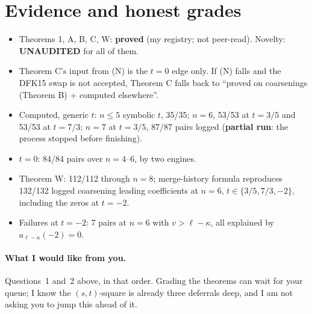 \documentclass[10pt]{article}
\newcommand{\ka}{\kappa}
\begin{document}
\section{Evidence and honest grades}
\begin{itemize}
\item Theorems 1, A, B, C, W: \textbf{proved} (my registry; not peer-read). Novelty: \textbf{UNAUDITED} for all of them.
\item Theorem C's input from (N) is the $t=0$ edge only. If (N) falls and the DFK15 swap is not accepted, Theorem C falls back
to ``proved on coarsenings (Theorem B) + computed elsewhere''.
\item Computed, generic $t$: $n\le5$ symbolic $t$, 35/35; $n=6$, 53/53 at $t=3/5$ and 53/53 at $t=7/3$;
$n=7$ at $t=3/5$, 87/87 pairs logged (\textbf{partial run}: the process stopped before finishing).
\item $t=0$: 84/84 pairs over $n=4$--$6$, by two engines.
\item Theorem W: 112/112 through $n=8$; merge-history formula reproduces 132/132 logged coarsening leading coefficients at
$n=6$, $t\in\{3/5,7/3,-2\}$, including the zeros at $t=-2$.
\item Failures at $t=-2$: 7 pairs at $n=6$ with $v>\ell-\ka$, all explained by $a_{\ell-\ka}(-2)=0$.
\end{itemize}

\paragraph{What I would like from you.} Questions~1 and~2 above, in that order. Grading the theorems can wait for your queue;
I know the $(s,t)$-square is already three deferrals deep, and I am not asking you to jump this ahead of it.
\end{document}
